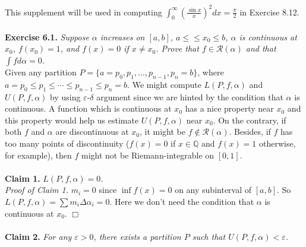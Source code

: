 \documentclass{article}
\begin{document}
This supplement will be used in computing
$\int_0^{\infty} (\frac{\sin x}{x})^2 dx = \frac{\pi}{2}$ in Exercise 8.12. \\\\






\textbf{Exercise 6.1.}
\emph{Suppose $\alpha$ increases on $[a, b]$, $a \leq ≤ x_0 \leq b$,
$\alpha$ is continuous at $x_0$, $f(x_0) = 1$, and $f(x) = 0$ if $x \neq x_0$.
Prove that $f \in \mathscr{R}(\alpha)$ and that $\int f d \alpha = 0$.} \\

Given any partition $P = \{a = p_0, p_1, \ldots, p_{n-1}, p_n = b \}$,
where $a = p_0 \leq p_1 \leq \cdots \leq p_{n-1} \leq p_n = b$.
We might compute $L(P, f, \alpha)$ and $U(P, f, \alpha)$ by using $\varepsilon$-$\delta$ argument
since we are hinted by the condition that $\alpha$ is continuous.
A function which is continuous at $x_0$ has a nice property near $x_0$
and this property would help us estimate $U(P, f, \alpha)$ near $x_0$.
On the contrary, if both $f$ and $\alpha$ are discontinuous at $x_0$,
it might be $f \not\in \mathscr{R}(\alpha)$.
Besides, if $f$ has too many points of discontinuity
($f(x) = 0$ if $x \in \mathbb{Q}$ and $f(x) = 1$ otherwise, for example),
then $f$ might not be Riemann-integrable on $[0, 1]$. \\\\



\textbf{Claim 1.}
\emph{$L(P, f, \alpha) = 0$.} \\

\emph{Proof of Claim 1.}
$m_i = 0$ since $\inf f(x) = 0$ on any subinterval of $[a, b]$.
So $L(P, f, \alpha) = \sum m_i \Delta \alpha_i = 0$.
Here we don't need the condition that $\alpha$ is continuous at $x_0$.
$\Box$ \\\\



\textbf{Claim 2.}
\emph{For any $\varepsilon > 0$,
there exists a partition $P$ such that $U(P, f, \alpha) < \varepsilon$.} \\
\end{document}
